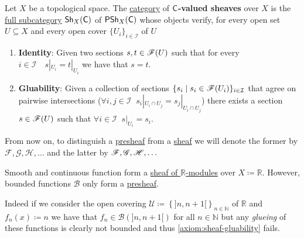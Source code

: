 \documentclass[../../main]{subfiles}
\begin{document}
\begin{definition} \label{def:sheaf}
  Let \(X\) be a topological space.
  The \hyperref[def:category]{category} of \textbf{\(\mathsf{C}\)-valued sheaves} over \(X\) is the \hyperref[def:subcategory]{full subcategory} \(\mathsf{Sh}_{X}(\mathsf{C})\) of \(\mathsf{PSh}_{X}(\mathsf{C})\) whose objects verify, for every open set \(U \subseteq X\) and every open cover \(\{U_{i}\}_{i \in \mathcal{I}}\) of \(U\)
  \begin{enumerate}[label=SH.\arabic*), ref=SH.\arabic*]
    \item\label{axiom:sheaf-identity} \textbf{Identity}: Given two sections \(s, t \in \mathscr{F}(U)\) such that for every \(i \in \mathcal{I} \quad s|_{U_{i}} = t|_{U_{i}}\) we have that \(s = t\).
    \item\label{axiom:sheaf-gluability} \textbf{Gluability}: Given a collection of sections \(\{s_{i} \mid s_{i} \in \mathscr{F}(U_{i})\}_{i \in \mathcal{I}}\) that agree on pairwise intersections (\(\forall i, j \in \mathcal{I} \;\; s_{i}|_{U_{i} \cap U_{j}} = s_{j}|_{U_{i} \cap U_{j}}\)) there exists a section \(s \in \mathscr{F}(U)\) such that \(\forall i \in \mathcal{I} \;\; s|_{U_{i}} = s_{i}\).
  \end{enumerate}
\end{definition}

\begin{notation}
  From now on, to distinguish a \hyperref[def:presheaf]{presheaf} from a \hyperref[def:sheaf]{sheaf} we will denote the former by \(\mathcal{F}, \mathcal{G}, \mathcal{H}, \ldots\) and the latter by \(\mathscr{F}, \mathscr{G}, \mathscr{H}, \ldots\)
\end{notation}

\begin{example}
  Smooth and continuous function form a \hyperref[def:sheaf]{sheaf of \(\mathbb{R}\)-modules} over \(X \coloneq \mathbb{R}\).
  However, bounded functions \(\mathcal{B}\) only form a \hyperref[def:presheaf]{presheaf}.

  Indeed if we consider the open covering \(\mathcal{U} \coloneq \left\{ ]n, n+1[ \right\}_{n \in \mathbb{N}}\) of \(\mathbb{R}\) and \(f_{n}(x) \coloneq n\) we have that \(f_{n} \in \mathcal{B}(]n, n+1[)\) for all \(n \in \mathbb{N}\) but any \textit{glueing} of these functions is clearly not bounded and thus \ref{axiom:sheaf-gluability} fails.
\end{example}
\end{document}
